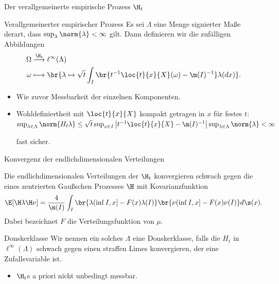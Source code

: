 \begin{frame}{Der verallgemeinerte empirische Prozess $\H_t$}
    \begin{definitionblockname}{Verallgemeinerter empirischer Prozess}
        Es sei $\Lambda$ eine Menge signierter Maße derart, dass $\sup_{\lambda} \norm{\lambda} < \infty$ gilt. Dann definieren wir die zufälligen Abbildungen
        \begin{align*}
            \Omega &\overset{\H_t}{\longrightarrow} \ell^\infty(\Lambda) \\
            \omega &\longmapsto \br{\lambda \mapsto \sqrt{t}\int_I \br{t^{-1}\loc{t}{x}{X}(\omega) - \m(I)^{-1}}\lambda(dx)}.
        \end{align*}
    \end{definitionblockname}
    \begin{itemize}
        \item Wie zuvor Messbarkeit der einzelnen Komponenten. 
        \item Wohldefiniertheit mit $\loc{t}{x}{X}$ kompakt getragen in $x$ für festes $t$:
        \pause
        $\sup_{\lambda \in \Lambda} \norm{H_t \lambda} \leq \sqrt{t}\sup_{x \in I} \left|t^{-1}\loc{t}{x}{X} - \m(I)^{-1}\right|\sup_{\lambda \in \Lambda} \norm{\lambda} < \infty$

        fast sicher.
    \end{itemize}
\end{frame}
\begin{frame}{Konvergenz der endlichdimensionalen Verteilungen}
    \begin{lemmablock}
        Die endlichdimensionalen Verteilungen der $\H_t$ konvergieren schwach gegen die eines zentrierten Gaußschen Prozesses $\H$ mit Kovarianzfunktion \[
\E[\H\lambda\H\nu] = \frac{4}{\m(I)} \int_I \br{\lambda(\inf I, x] - F(x)\lambda(I)} \br{\nu(\inf I, x] - F(x)\nu(I)} d \s(x).
        \] Dabei bezeichnet $F$ die Verteilungsfunktion von $\mu$. 
    \end{lemmablock}
    
    \begin{definitionblockname}{Donskerklasse}
        Wir nennen ein solches $\Lambda$ eine Donskerklasse, falls die $H_t$ in $\ell^\infty(\Lambda)$ schwach gegen einen straffen Limes konvergieren, der eine Zufallsvariable ist.
    \end{definitionblockname}
\begin{itemize}
    \item $\H_t$s a priori nicht unbedingt messbar.
\end{itemize}
\end{frame}
